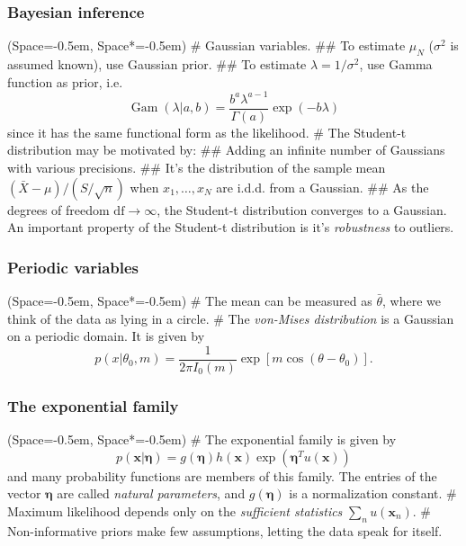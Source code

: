 \documentclass[12pt, a4paper]{article}
\newcommand{\listSpace}{-0.5em}%
\newcommand{\vect}[1]{\bm{#1}}
\begin{document}
\subsubsection*{Bayesian inference}
\begin{easylist}[itemize]
	\ListProperties(Space=\listSpace, Space*=\listSpace)
	# Gaussian variables.
	## To estimate $\mu_N$ ($\sigma^2$ is assumed known), use Gaussian prior.
	## To estimate $\lambda = 1/\sigma^2$, use Gamma function as prior, i.e.
	\begin{equation*}
	\operatorname{Gam}(\lambda | a, b) = \frac{b^a \lambda^{a-1}}{\Gamma(a)} \exp (-b \lambda)
	\end{equation*}
	since it has the same functional form as the likelihood.
	# The Student-t distribution may be motivated by:
	## Adding an infinite number of Gaussians with various precisions. 
	## It's the distribution of the sample mean  $(\bar{X} - \mu ) / (S / \sqrt{n})$ when $x_1, \dots, x_N$ are i.d.d. from a Gaussian.
	## As the degrees of freedom $\text{df} \to \infty$, the Student-t distribution converges to a Gaussian.
	An important property of the Student-t distribution is it's \emph{robustness} to outliers.
\end{easylist}

\subsubsection*{Periodic variables}
\begin{easylist}[itemize]
	\ListProperties(Space=\listSpace, Space*=\listSpace)
	# The mean can be measured as $\bar{\theta}$, where we think of the data as lying in a circle.
	# The \emph{von-Mises distribution} is a Gaussian on a periodic domain.
	It is given by
	\begin{equation*}
	p(x | \theta_0, m) = \frac{1}{2 \pi I_0(m)} \exp \left[m \cos (\theta - \theta_0)\right].
	\end{equation*}
\end{easylist}

\subsubsection*{The exponential family}
\begin{easylist}[itemize]
	\ListProperties(Space=\listSpace, Space*=\listSpace)
	# The exponential family is given by
	\begin{equation*}
	p(\vect{x} | \vect{\eta}) =
	g(\vect{\eta})  h (\vect{x}) 
	\exp \left( \vect{\eta}^T u(\vect{x}) \right)
	\end{equation*}
	and many probability functions are members of this family.
	The entries of the vector $\vect{\eta}$ are called \emph{natural parameters}, and $g(\vect{\eta})$ is a normalization constant.
	# Maximum likelihood depends only on the \emph{sufficient statistics} $\sum_n u(\vect{x}_n)$.
	# Non-informative priors make few assumptions,
	letting the data speak for itself.
\end{easylist}
\end{document}
